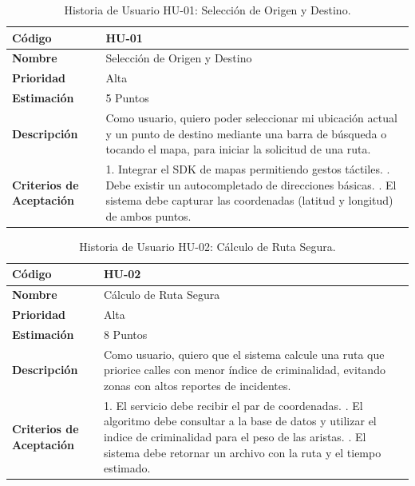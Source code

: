 \begin{table}[H]
\caption{Historia de Usuario HU-01: Selección de Origen y Destino.}
\label{tab:historias-usuario-1}
\centering
\begin{tabular}{|p{4cm}|p{10cm}|}
\hline
\textbf{Código} & HU-01 \\ \hline
\textbf{Nombre} & Selección de Origen y Destino \\ \hline
\textbf{Prioridad} & Alta \\ \hline
\textbf{Estimación} & 5 Puntos \\ \hline
\textbf{Descripción} &
Como usuario, quiero poder seleccionar mi ubicación actual y un punto de destino mediante una barra de búsqueda o tocando el mapa, para iniciar la solicitud de una ruta. \\ \hline
\textbf{Criterios de Aceptación} &
1. Integrar el SDK de mapas permitiendo gestos táctiles. \newline
2. Debe existir un autocompletado de direcciones básicas. \newline
3. El sistema debe capturar las coordenadas (latitud y longitud) de ambos puntos. \\ \hline
\end{tabular}
\end{table}

\begin{table}[H]
\caption{Historia de Usuario HU-02: Cálculo de Ruta Segura.}
\label{tab:historias-usuario-2}
\centering
\begin{tabular}{|p{4cm}|p{10cm}|}
\hline
\textbf{Código} & HU-02 \\ \hline
\textbf{Nombre} & Cálculo de Ruta Segura \\ \hline
\textbf{Prioridad} & Alta \\ \hline
\textbf{Estimación} & 8 Puntos \\ \hline
\textbf{Descripción} &
Como usuario, quiero que el sistema calcule una ruta que priorice calles con menor índice de criminalidad, evitando zonas con altos reportes de incidentes. \\ \hline
\textbf{Criterios de Aceptación} &
1. El servicio debe recibir el par de coordenadas. \newline
2. El algoritmo debe consultar a la base de datos y utilizar el indice de criminalidad para el peso de las aristas. \newline
3. El sistema debe retornar un archivo con la ruta y el tiempo estimado. \\ \hline
\end{tabular}
\end{table}



